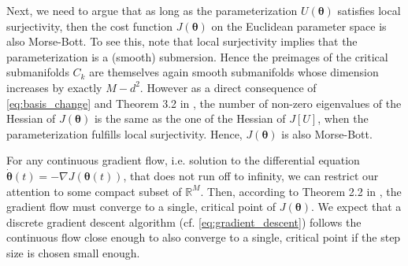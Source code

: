 \documentclass{article}
\renewcommand{\vec}[1]{\ensuremath{\boldsymbol{#1}}}
\begin{document}
Next, we need to argue that as long as the parameterization \(U(\vec{\theta})\) satisfies local surjectivity, then the cost function \(J(\vec{\theta})\) on the Euclidean parameter space is also Morse-Bott.
To see this, note that local surjectivity implies that the parameterization is a (smooth) submersion.
Hence the preimages of the critical submanifolds \(C_k\) are themselves again smooth submanifolds whose dimension increases by exactly \(M-d^2\).
However as a direct consequence of \cref{eq:basis_change} and Theorem 3.2 in \cite{higham_modifying_1998}, the number of non-zero eigenvalues of the Hessian of \(J(\vec{\theta})\) is the same as the one of the Hessian of \(J[U]\), when the parameterization fulfills local surjectivity.
Hence, \(J(\vec{\theta})\) is also Morse-Bott.

For any continuous gradient flow, i.e. solution to the differential equation \(\dot{\vec{\theta}}(t) = -\nabla J(\vec{\theta}(t))\), that does not run off to infinity, we can restrict our attention to some compact subset of \(\mathds{R}^M\).
Then, according to Theorem 2.2 in \cite{marinkovic_symplectic_2022}, the gradient flow must converge to a single, critical point of \(J(\vec{\theta})\).
We expect that a discrete gradient descent algorithm (cf. \cref{eq:gradient_descent}) follows the continuous flow close enough to also converge to a single, critical point if the step size is chosen small enough.
\end{document}
